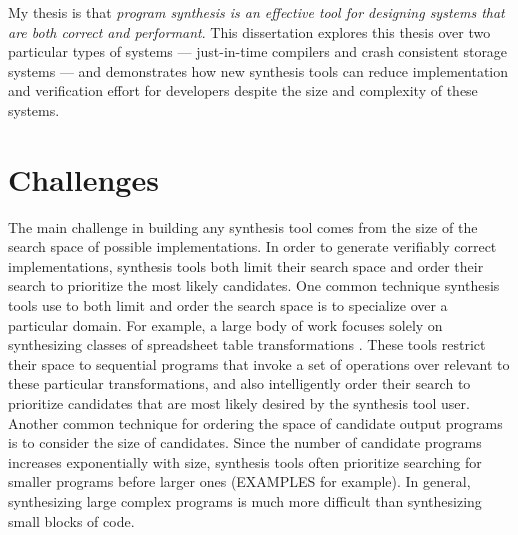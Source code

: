 

My thesis is that \textit{program
synthesis is an effective tool for designing systems that are both correct and
performant}.  This dissertation explores this thesis over two particular types
of systems --- just-in-time compilers and crash consistent storage systems ---
and demonstrates how new synthesis tools can reduce implementation and verification
effort for developers despite the size and complexity of these systems.


\section{Challenges}

The main challenge in building any synthesis tool comes from the size of the
search space of possible implementations.
In order to generate verifiably correct implementations, synthesis tools both limit
their search space and order their search to prioritize the most likely candidates.
One common technique synthesis tools use to both limit and order the search space is
to specialize over a particular domain.
For example, a large body of work focuses solely on synthesizing classes of spreadsheet
table transformations .
These tools restrict their space to sequential programs that invoke a set
of operations over relevant to these particular transformations, and also intelligently
order their search to prioritize candidates that are most likely desired by the synthesis
tool user.
Another common technique for ordering the space of candidate output programs is to
consider the size of candidates.
Since the number of candidate programs increases exponentially with size,
synthesis tools often prioritize searching for smaller programs before larger ones
(EXAMPLES for example).
In general, synthesizing large complex programs is much more difficult than
synthesizing small blocks of code.


